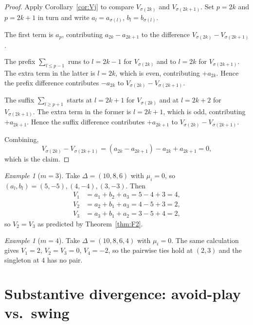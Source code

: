\documentclass[11pt,a4paper]{amsart}
\theoremstyle{definition}
\theoremstyle{remark}
\newtheorem{example}[theorem]{Example}
\begin{document}
\begin{proof}
Apply Corollary~\ref{cor:Vj} to compare $V_{\sigma(2k)}$ and
$V_{\sigma(2k+1)}$. Set $p = 2k$ and $p = 2k+1$ in turn and write
$a_l = a_{\sigma(l)}$, $b_l = b_{\sigma(l)}$.

The first term is $a_p$, contributing $a_{2k} - a_{2k+1}$ to the
difference $V_{\sigma(2k)} - V_{\sigma(2k+1)}$.

The prefix $\sum_{l \leq p-1}$ runs to $l = 2k-1$ for $V_{\sigma(2k)}$
and to $l = 2k$ for $V_{\sigma(2k+1)}$. The extra term in the latter
is $l = 2k$, which is even, contributing $+a_{2k}$. Hence the prefix
difference contributes $-a_{2k}$ to $V_{\sigma(2k)} - V_{\sigma(2k+1)}$.

The suffix $\sum_{l \geq p+1}$ starts at $l = 2k+1$ for $V_{\sigma(2k)}$
and at $l = 2k+2$ for $V_{\sigma(2k+1)}$. The extra term in the former
is $l = 2k+1$, which is odd, contributing $+a_{2k+1}$. Hence the suffix
difference contributes $+a_{2k+1}$ to $V_{\sigma(2k)} - V_{\sigma(2k+1)}$.

Combining,
\[
  V_{\sigma(2k)} - V_{\sigma(2k+1)} = (a_{2k} - a_{2k+1})
  - a_{2k} + a_{2k+1} = 0,
\]
which is the claim.
\end{proof}

\begin{example}[$m = 3$]\label{ex:m3}
Take $\Delta = (10, 8, 6)$ with $\mu_i = 0$, so
$(a_l, b_l) = (5, -5), (4, -4), (3, -3)$. Then
\begin{align*}
  V_1 &= a_1 + b_2 + a_3 = 5 - 4 + 3 = 4,
  \\
  V_2 &= a_2 + b_1 + a_3 = 4 - 5 + 3 = 2,
  \\
  V_3 &= a_3 + b_1 + a_2 = 3 - 5 + 4 = 2,
\end{align*}
so $V_2 = V_3$ as predicted by Theorem~\ref{thm:F2}.
\end{example}

\begin{example}[$m = 4$]\label{ex:m4}
Take $\Delta = (10, 8, 6, 4)$ with $\mu_i = 0$. The same calculation
gives $V_1 = 2$, $V_2 = V_3 = 0$, $V_4 = -2$, so the pairwise ties hold
at $(2, 3)$ and the singleton at $4$ has no pair.
\end{example}

\section{Substantive divergence: avoid-play vs.\ swing}\label{sec:F3}
\end{document}
